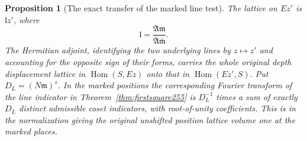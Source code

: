 \documentclass[a4paper,11pt]{article}
\newtheorem{proposition}{Proposition}[section]
\theoremstyle{definition}
\theoremstyle{remark}
\numberwithin{equation}{section}
\begin{document}
\begin{proposition}[The exact transfer of the marked line test]\leavevmode
\label{prop:oppline256}
The lattice on \(Ez'\) is \(\mathfrak l z'\), where
\[
      \mathfrak l=\frac{\mathfrak A\mathfrak m}
                             {\bar{\mathfrak A}\bar{\mathfrak m}} .
\]
The Hermitian adjoint, identifying the two underlying lines by
\(z\mapsto z'\) and accounting for the opposite sign of their
forms, carries the whole original depth displacement lattice in
\(\operatorname{Hom}(S,Ez)\) onto that in
\(\operatorname{Hom}(Ez',S)\). Put \(D_L=(N\mathfrak m)^s\).
In the marked positions the corresponding Fourier transform of
the line indicator in Theorem~\ref{thm:firstsquare255} is
\(D_L^{-1}\) times a sum of exactly \(D_L\) distinct admissible
coset indicators, with root-of-unity coefficients. This is in
the normalization giving the original unshifted position lattice
volume one at the marked places.
\end{proposition}
\end{document}

